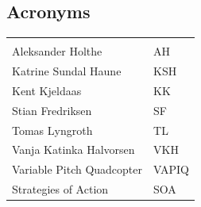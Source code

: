 \documentclass{article}
\begin{document}
\vspace*{3.0 cm}

\begin{center}
\section*{\textbf{Acronyms}}
\begin{tabular}{ll}
\rowcolor{cadetgrey}
    &   \\
Aleksander Holthe      & AH     \\\rowcolor{gainsboro}
Katrine Sundal Haune  & KSH \\
Kent Kjeldaas         & KK \\\rowcolor{gainsboro}
Stian Fredriksen      & SF  \\
Tomas Lyngroth       & TL   \\\rowcolor{gainsboro}
Vanja Katinka Halvorsen     & VKH   \\
Variable Pitch Quadcopter   & VAPIQ \\\rowcolor{gainsboro}
Strategies of Action    & SOA

\end{tabular}                                                             
\end{center}




\newpage

\newpage

\tableofcontents
\newpage


\newpage


\newpage


\newpage


\newpage


\newpage


\newpage




\newpage
\end{document}
